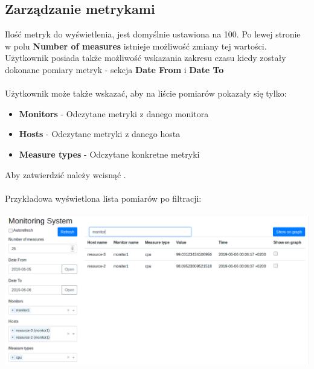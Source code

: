 \documentclass{article}
\begin{document}
\subsection{Zarządzanie metrykami}
Ilość metryk do wyświetlenia, jest domyślnie ustawiona na 100. Po lewej stronie w polu \textbf{Number of measures}  istnieje możliwość zmiany tej wartości. Użytkownik posiada także możliwość wskazania zakresu czasu kiedy zostały dokonane pomiary metryk - sekcja \textbf{Date From} i \textbf{Date To}  \\\\ 
Użytkownik może także wskazać, aby na liście pomiarów pokazały się tylko:
\begin{itemize}
\item \textbf{Monitors} - Odczytane metryki z danego monitora 
\item \textbf{Hosts} - Odczytane metryki z danego hosta 
\item \textbf{Measure types} - Odczytane konkretne metryki 
\end{itemize}
Aby zatwierdzić należy wcisnąć  .\\\\ 
Przykładowa wyświetlona lista pomiarów po filtracji:\\\\
\includegraphics[width=\linewidth]{../screen/ResourceMonitorFilter.png}

\newpage
\end{document}

